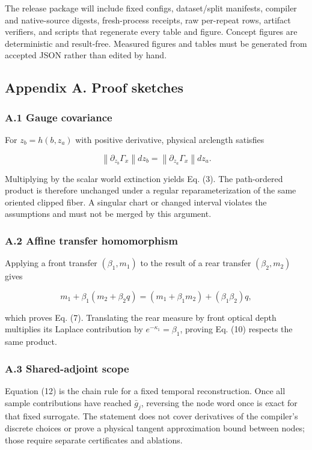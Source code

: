 \documentclass[
]{article}
\begin{document}
The release package will include fixed configs, dataset/split manifests,
compiler and native-source digests, fresh-process receipts, raw
per-repeat rows, artifact verifiers, and scripts that regenerate every
table and figure. Concept figures are deterministic and result-free.
Measured figures and tables must be generated from accepted JSON rather
than edited by hand.

\subsection{Appendix A. Proof
sketches}\label{appendix-a.-proof-sketches}

\subsubsection{A.1 Gauge covariance}\label{a.1-gauge-covariance}

For \(z_b=h(b,z_a)\) with positive derivative, physical arclength
satisfies

\[
\left\|\partial_{z_b}\Gamma_x\right\|dz_b
=\left\|\partial_{z_a}\Gamma_x\right\|dz_a.
\]

Multiplying by the scalar world extinction yields Eq. (3). The
path-ordered product is therefore unchanged under a regular
reparameterization of the same oriented clipped fiber. A singular chart
or changed interval violates the assumptions and must not be merged by
this argument.

\subsubsection{A.2 Affine transfer
homomorphism}\label{a.2-affine-transfer-homomorphism}

Applying a front transfer \((\beta_1,m_1)\) to the result of a rear
transfer \((\beta_2,m_2)\) gives

\[
m_1+\beta_1(m_2+\beta_2q)
=(m_1+\beta_1m_2)+(\beta_1\beta_2)q,
\]

which proves Eq. (7). Translating the rear measure by front optical
depth multiplies its Laplace contribution by \(e^{-\kappa_1}=\beta_1\),
proving Eq. (10) respects the same product.

\subsubsection{A.3 Shared-adjoint scope}\label{a.3-shared-adjoint-scope}

Equation (12) is the chain rule for a fixed temporal reconstruction.
Once all sample contributions have reached \(\bar g_j\), reversing the
node word once is exact for that fixed surrogate. The statement does not
cover derivatives of the compiler's discrete choices or prove a physical
tangent approximation bound between nodes; those require separate
certificates and ablations.
\end{document}
